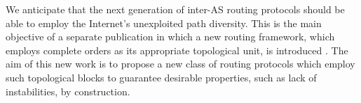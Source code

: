 \documentclass[10pt,final,journal]{IEEEtran}
\begin{document}
We anticipate that the next generation of inter-AS routing protocols should be able to employ the Internet's unexploited path diversity. This is the main objective of a separate publication in which a new routing framework, which employs complete orders as its appropriate topological unit, is introduced \cite{Arjona-Villicana2009a}. The aim of this new work is to propose a new class of routing protocols which employ such topological blocks to guarantee desirable properties, such as lack of instabilities, by construction.



\end{document}
